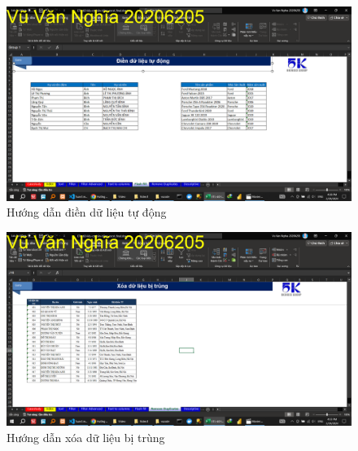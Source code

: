 \documentclass{article}
\begin{document}
\begin{figure}[h]
    \centering
    \includegraphics[scale = 0.15]{Video1/HuongDan/11.png}
    \caption{Hướng dẫn điền dữ liệu tự động}
\end{figure}

\begin{figure}[h]
    \centering
    \includegraphics[scale = 0.15]{Video1/HuongDan/12.png}
    \caption{Hướng dẫn xóa dữ liệu bị trùng}
\end{figure}
\end{document}
